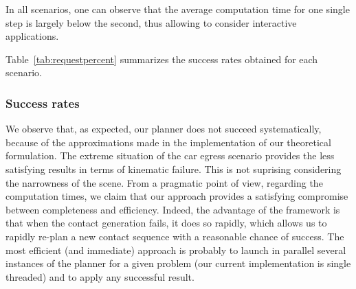 In all scenarios, one can observe that the average computation time for one single step is largely below the second,
thus allowing to consider interactive applications. 

Table~\ref{tab:requestpercent} summarizes the success rates obtained for each scenario.

\subsubsection{Success rates}
We observe that, as expected, our planner does not succeed systematically, because of the approximations made in the implementation
of our theoretical formulation. The extreme situation of the car egress scenario provides the less satisfying results in terms of kinematic failure. This is not
suprising considering the narrowness of the scene.
From a pragmatic point of view, regarding the computation times, we claim that our approach provides a satisfying compromise between completeness and efficiency.
Indeed, the advantage of the framework is that when the contact generation fails, it does so rapidly, which allows us to rapidly re-plan a new contact sequence with a reasonable chance of success.
The most efficient (and immediate) approach is probably to launch in parallel several instances of the planner for a given problem (our current implementation is single threaded) and to apply any successful result.
